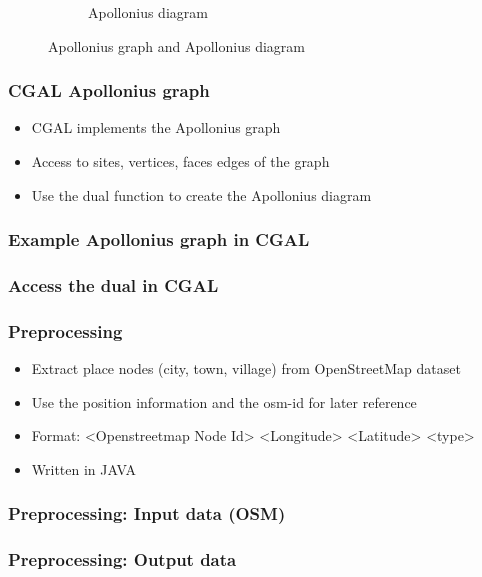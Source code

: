 \documentclass{beamer}
\begin{document}
\begin{frame}
\begin{figure}[htp]
\begin{subfigure}[b]{0.48\textwidth}
                    \caption{Apollonius diagram}
                    \label{fig:apo-diagram}
            \end{subfigure}
            \caption{Apollonius graph and Apollonius diagram}\label{fig:apollonius}
    \end{figure}
\end{frame}

\begin{frame}
    \frametitle{CGAL Apollonius graph}
    \begin{itemize}
        \item CGAL implements the Apollonius graph
        \item Access to sites, vertices, faces edges of the graph
        \item Use the dual function to create the Apollonius diagram
    \end{itemize}
\end{frame}

\begin{frame}
    \frametitle{Example Apollonius graph in CGAL}
    
\end{frame}

\begin{frame}
    \frametitle{Access the dual in CGAL}
    
\end{frame}

\begin{frame}
    \frametitle{Preprocessing}
    \begin{itemize}
        \item Extract place nodes (city, town, village) from OpenStreetMap dataset
        \item Use the position information and the osm-id for later reference
        \item Format: <Openstreetmap Node Id> <Longitude> <Latitude> <type>
        \item Written in JAVA
    \end{itemize}
\end{frame}

\begin{frame}
    \frametitle{Preprocessing: Input data (OSM)}
    
\end{frame}

\begin{frame}
    \frametitle{Preprocessing: Output data}
    
\end{frame}
\end{document}
